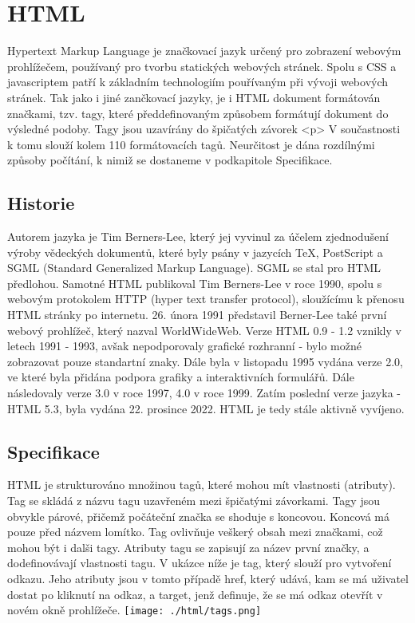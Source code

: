 \documentclass[main.tex]{subfiles}
\begin{document}
\section{HTML}
Hypertext Markup Language je značkovací jazyk určený pro zobrazení webovým prohlížečem, používaný pro tvorbu statických webových stránek. Spolu s CSS a javascriptem patří k základním technologiím pouřívaným při vývoji webových stránek. Tak jako i jiné zančkovací jazyky, je i HTML dokument formátován značkami, tzv. tagy, které předdefinovaným způsobem formátují dokument do výsledné podoby. Tagy jsou uzavírány do špičatých závorek <p> \cite{web:wik:en:html} V součastnosti k tomu slouží kolem 110 formátovacích tagů. Neurčitost je dána rozdílnými způsoby počítání, k nimiž se dostaneme v podkapitole Specifikace. \cite{web:en:counting_html}


\subsection{Historie}
Autorem jazyka je Tim Berners-Lee, který jej vyvinul za účelem zjednodušení výroby vědeckých dokumentů, které byly psány v jazycích TeX, PostScript a SGML (Standard Generalized Markup Language). SGML se stal pro HTML předlohou. Samotné HTML publikoval Tim Berners-Lee v roce 1990, spolu s webovým protokolem HTTP (hyper text transfer protocol), sloužícímu k přenosu HTML stránky po internetu. 26. února 1991 představil Berner-Lee také první webový prohlížeč, který nazval WorldWideWeb.
Verze HTML 0.9 - 1.2 vznikly v letech 1991 - 1993, avšak nepodporovaly grafické rozhranní - bylo možné zobrazovat pouze standartní znaky. Dále byla v listopadu 1995 vydána verze 2.0, ve které byla přidána podpora grafiky a interaktivních formulářů. Dále následovaly verze 3.0 v roce 1997, 4.0 v roce 1999. Zatím poslední verze jazyka - HTML 5.3, byla vydána 22. prosince 2022. HTML je tedy stále aktivně vyvíjeno. \cite{web:wik:en:html}


\subsection{Specifikace}
HTML je strukturováno množinou tagů, které mohou mít vlastnosti (atributy). Tag se skládá z názvu tagu uzavřeném mezi špičatými závorkami. Tagy jsou obvykle párové, přičemž počáteční značka se shoduje s koncovou. Koncová má pouze před názvem lomítko. Tag ovlivňuje veškerý obsah mezi značkami, což mohou být i dalši tagy. Atributy tagu se zapisují za název první značky, a dodefinovávají vlastnosti tagu. V ukázce níže je tag, který slouží pro vytvoření odkazu. Jeho atributy jsou v tomto případě href, který udává, kam se má uživatel dostat po kliknutí na odkaz, a target, jenž definuje, že se má odkaz otevřít v novém okně prohlížeče.\cite{web:wik:en:html}
\texttt{[image: ./html/tags.png]} %
\end{document}
